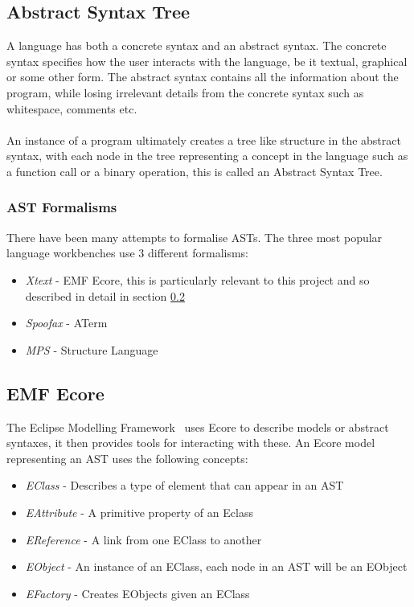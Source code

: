 \documentclass{article}
\begin{document}
\subsection{Abstract Syntax Tree}
A language has both a concrete syntax and an abstract syntax. The concrete syntax specifies how the user interacts with the language, be it textual, graphical or some other form. The abstract syntax contains all the information about the program, while losing irrelevant details from the concrete syntax such as whitespace, comments etc.
\\
\\
An instance of a program ultimately creates a tree like structure in the abstract syntax, with each node in the tree representing a concept in the language such as a function call or a binary operation, this is called an Abstract Syntax Tree.
\subsubsection{AST Formalisms}\label{astFormalisms}
There have been many attempts to formalise ASTs. The three most popular language workbenches use 3 different formalisms: \begin{itemize}
\item \emph{Xtext} - EMF Ecore, this is particularly relevant to this project and so described in detail in section \ref{emf}
\item \emph{Spoofax} - ATerm~\cite{aterm} 
\item \emph{MPS} - Structure Language~\cite{mpsStructureLanguage} 
\end{itemize}
\subsection{EMF Ecore}\label{emf}
The Eclipse Modelling Framework~\cite{emf} uses Ecore to describe models or abstract syntaxes, it then provides tools for interacting with these. An Ecore model representing an AST uses the following concepts:
\begin{itemize}
\item \emph{EClass} - Describes a type of element that can appear in an AST
\item \emph{EAttribute} - A primitive property of an Eclass
\item \emph{EReference} - A link from one EClass to another
\item \emph{EObject} - An instance of an EClass, each node in an AST will be an EObject
\item \emph{EFactory} - Creates EObjects given an EClass
\end{itemize}
\end{document}
